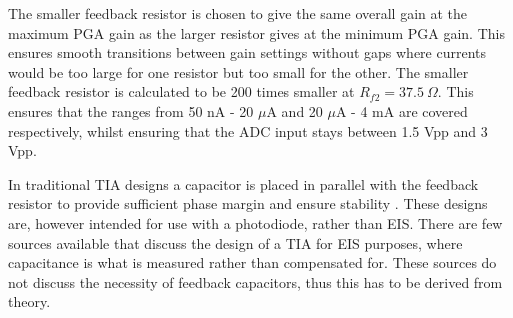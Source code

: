 The smaller feedback resistor is chosen to give the same overall gain at the maximum \ac{PGA} gain as the larger resistor gives at the minimum \ac{PGA} gain. This ensures smooth transitions between gain settings without gaps where currents would be too large for one resistor but too small for the other. The smaller feedback resistor is calculated to be 200 times smaller at $R_{f2}=37.5~\Omega$. This ensures that the ranges from 50 nA - 20 $\mu$A and 20 $\mu$A - 4 mA are covered respectively, whilst ensuring that the \ac{ADC} input stays between 1.5 Vpp and 3 Vpp.

In traditional TIA designs a capacitor is placed in parallel with the feedback resistor to provide sufficient phase margin and ensure stability \cite{StabilizeYourTransimpedance}. These designs are, however intended for use with a photodiode, rather than \ac{EIS}. There are few sources available that discuss the design of a TIA for EIS purposes, where capacitance is what is measured rather than compensated for. These sources do not discuss the necessity of feedback capacitors, thus this has to be derived from theory.

